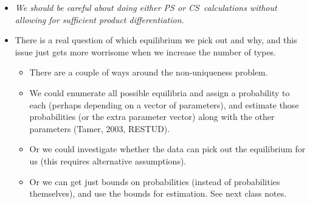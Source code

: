 \documentclass[notes=show]{beamer}
\begin{document}
\begin{frame}%


\begin{itemize}
\item \textit{We should be careful about doing either PS or CS\ calculations
without allowing for sufficient product differentiation. }

\item There is a real question of which equilibrium we pick out and why, and
this issue just gets more worrisome when we increase the number of types.

\begin{itemize}
\item There are a couple of ways around the non-uniqueness problem.

\item We could enumerate all possible equilibria and assign a probability to
each (perhaps depending on a vector of parameters), and estimate those
probabilities (or the extra parameter vector) along with the other
parameters (Tamer, 2003, RESTUD).

\item Or we could investigate whether the data can pick out the equilibrium
for us (this requires alternative assumptions).

\item Or we can get just bounds on probabilities (instead of probabilities
themselves), and use the bounds for estimation. See next class notes.
\end{itemize}
\end{itemize}

\end{frame}%
\end{document}
